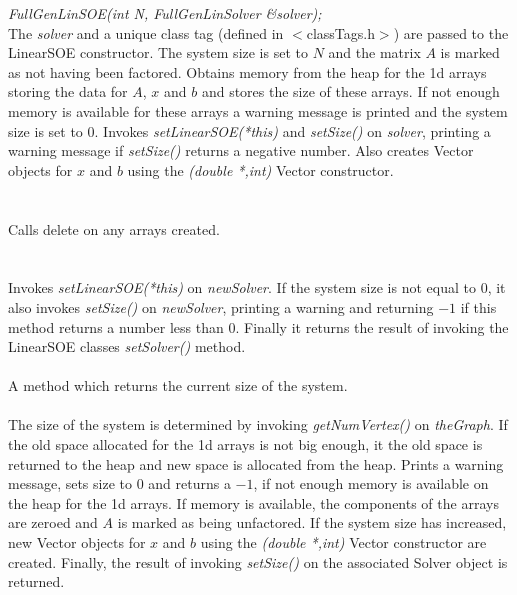 {\em FullGenLinSOE(int N, FullGenLinSolver \&solver); }\\
The {\em solver} and a unique class tag (defined in $<$classTags.h$>$)
are passed to the LinearSOE constructor. The system size is set
to $N$ and the matrix $A$ is marked as not having been
factored. Obtains memory from the heap for the 1d arrays storing the
data for $A$, $x$ and $b$ and stores the size of these arrays. If not
enough memory is available for these arrays a warning message is
printed and the system size is set to $0$. Invokes {\em
setLinearSOE(*this)} and {\em setSize()} on {\em solver},
printing a warning message if {\em setSize()} returns a negative
number. Also creates Vector objects for $x$ and $b$ using the {\em
(double *,int)} Vector constructor. \\

 \\
\\ 
Calls delete on any arrays created. \\

 \\
\\
Invokes {\em setLinearSOE(*this)} on {\em newSolver}.
If the system size is not equal to $0$, it also invokes {\em setSize()}
on {\em newSolver}, printing a warning and returning $-1$ if this
method returns a number less than $0$. Finally it returns the result
of invoking the LinearSOE classes {\em setSolver()} method. \\

 \\
A method which returns the current size of the system. \\

 \\ 
The size of the system is determined by invoking {\em getNumVertex()}
on {\em theGraph}. If the old space allocated for the 1d arrays is not
big enough, it the old space is returned to the heap and new space is
allocated from the heap. Prints a warning message, sets size to $0$
and returns a $-1$, if not enough memory is available on the heap for the 
1d arrays. If memory is available, the components of the arrays are
zeroed and $A$ is marked as being unfactored. If the system size has
increased, new Vector objects for $x$ and $b$ using the {\em (double
*,int)} Vector constructor are created. Finally, the result of
invoking {\em setSize()} on the associated Solver object is returned. \\


